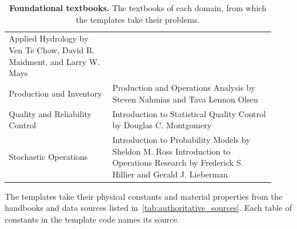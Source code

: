 \begin{table}[t]
\begin{tabular}{p{0.35\linewidth} p{0.55\linewidth}}
Applied Hydrology by Ven Te Chow, David R. Maidment, and Larry W. Mays \\
\addlinespace[2pt]
Production and Inventory & Production and Operations Analysis by Steven Nahmias and Tava Lennon
Olsen \\
Quality and Reliability Control & Introduction to Statistical Quality Control by Douglas C.
Montgomery \\
Stochastic Operations & Introduction to Probability Models by Sheldon M. Ross \newline
Introduction to Operations Research by Frederick S. Hillier and Gerald J. Lieberman \\
\bottomrule
\end{tabular}
\caption{\textbf{Foundational textbooks.} The textbooks of each domain, from which the templates
take their problems.}
\label{tab:foundational_textbooks}
\end{table}

The templates take their physical constants and material properties from the handbooks and data
sources listed in~\autoref{tab:authoritative_sources}.
Each table of constants in the template code names its source.

